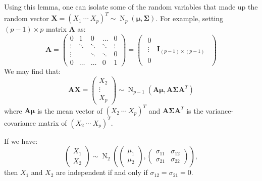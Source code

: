 \documentclass{huhtakm-template-book-v2}
\DeclareMathOperator{\N}{N}
\begin{document}
\begin{eg}
	Using this lemma, one can isolate some of the random variables that made up the random vector $\mathbf{X}=(X_{1}\ \cdots\ X_{p})^{T}\sim\N_{p}(\boldsymbol{\mu},\mathbf{\Sigma})$. For example, setting $(p-1)\times p$ matrix $\mathbf{A}$ as:
	\begin{equation*}
		\mathbf{A}=\begin{pmatrix}
			0 & 1 & 0 & \hdots & 0\\
			\vdots & \ddots & \ddots & \ddots & \vdots\\
			\vdots & & \ddots & \ddots & 0\\
			0 & \hdots & \hdots & 0 & 1
		\end{pmatrix}=\begin{pmatrix}\begin{array}{c|c}
			0 & \\
			\vdots & \mathbf{I}_{(p-1)\times(p-1)}\\
			0 &
		\end{array}\end{pmatrix}
	\end{equation*}
	We may find that:
	\begin{equation*}
		\mathbf{AX}=\begin{pmatrix}
		X_{2}\\
		\vdots\\
		X_{p}
		\end{pmatrix}\sim\N_{p-1}(\mathbf{A}\boldsymbol{\mu},\mathbf{A\Sigma A}^{T})
	\end{equation*}
	where $\mathbf{A}\boldsymbol{\mu}$ is the mean vector of $(X_{2}\ \cdots\ X_{p})^{T}$ and $\mathbf{A\Sigma A}^{T}$ is the variance-covariance matrix of $(X_{2}\ \cdots\ X_{p})^{T}$.
\end{eg}
\begin{lem}
	\label{Chapter 1 (Lemma) Independence iff uncorrelated and bivariate}
	If we have:
	\begin{equation*}
		\begin{pmatrix}X_{1}\\X_{2}\end{pmatrix}\sim\N_{2}\left(\begin{pmatrix}\mu_{1}\\\mu_{2}\end{pmatrix},\begin{pmatrix}\sigma_{11}&\sigma_{12}\\\sigma_{21}&\sigma_{22}\end{pmatrix}\right),
	\end{equation*}
	then $X_{1}$ and $X_{2}$ are independent if and only if $\sigma_{12}=\sigma_{21}=0$.
\end{lem}
\end{document}
